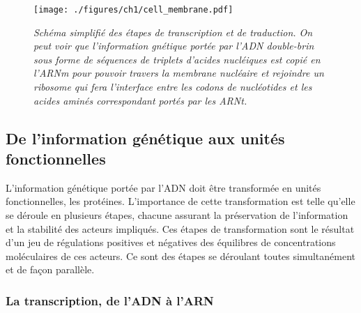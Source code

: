 \begin{figure}
  \centering
  {\texttt{[image: ./figures/ch1/cell\_membrane.pdf]}}
    \caption{\it Schéma simplifié des étapes de transcription et de traduction. On peut voir que l'information gnétique portée par l'ADN double-brin sous forme de séquences de triplets d'acides nucléiques est copié en l'ARNm pour pouvoir travers la membrane nucléaire et rejoindre un ribosome qui fera l'interface entre les codons de nucléotides et les acides aminés correspondant portés par les ARNt.}
    \label{Fig:cell_membrane}
  \hspace{0.2cm}
\end{figure}


\subsection{De l'information génétique aux unités fonctionnelles} \label{trans_trad}

L'information génétique portée par l'ADN doit être transformée en unités fonctionnelles, les protéines. L'importance de cette transformation est telle qu'elle se déroule en plusieurs étapes, chacune assurant la préservation de l'information et la stabilité des acteurs impliqués. Ces étapes de transformation sont le résultat d'un jeu de régulations positives et négatives des équilibres de concentrations moléculaires de ces acteurs. Ce sont des étapes se déroulant toutes simultanément et de façon parallèle.

\subsubsection{La transcription, de l'ADN à l'ARN}



